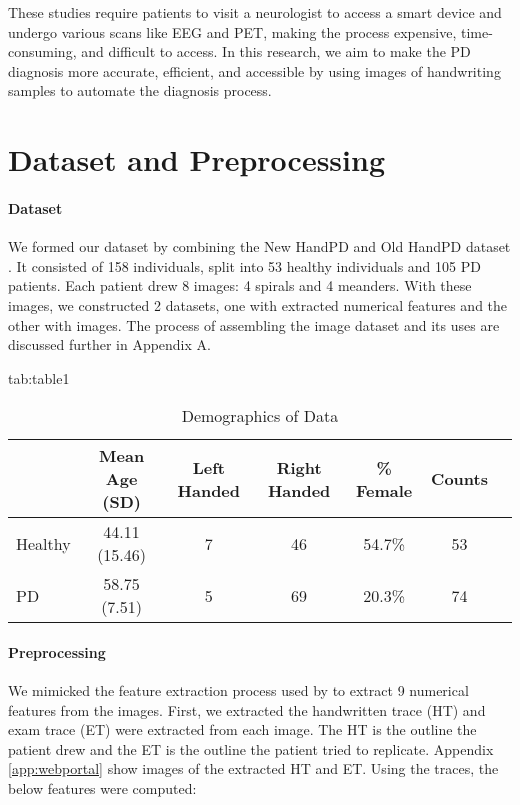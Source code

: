 \documentclass[pmlr,twocolumn,10pt,breaklinks, x11names,table]{jmlr} %
\begin{document}
These studies require patients to visit a neurologist to access a smart device and undergo various scans like EEG and PET, making the process expensive, time-consuming, and difficult to access. In this research, we aim to make the PD diagnosis more accurate, efficient, and accessible by using images of handwriting samples to automate the diagnosis process. 

\section{Dataset and Preprocessing}
\label{sec:Dataset+Preprocessing}

\paragraph{Dataset}
\label{sec:Dataset} We formed our dataset by combining the New HandPD and Old HandPD dataset \citep{pereira2016new}. It consisted of 158 individuals, split into 53 healthy individuals and 105 PD patients. Each patient drew 8 images: 4 spirals and 4 meanders. With these images, we constructed 2 datasets, one with extracted numerical features and the other with images. The process of assembling the image dataset and its uses are discussed further in Appendix A.

\begin{table*}[hbtp]
\centering 
\floatconts
{tab:table1}
{\caption{Demographics of Data}} 
    {
        \begin{tabular}{lcccccc}
        \toprule
        \bfseries & \bfseries Mean Age (SD) & \bfseries Left Handed & \bfseries Right Handed & \bfseries \% Female & \bfseries Counts \\
        \midrule
        Healthy & 44.11 (15.46) & 7 & 46 & 54.7\% & 53 \\
        PD & 58.75 (7.51) & 5 & 69 & 20.3\% & 74 \\
        \bottomrule
        \end{tabular}
    }
\end{table*}

\paragraph{Preprocessing}
\label{sec:Preprocessing} 
We mimicked the feature extraction process used by \citep{pereira2016new} to extract 9 numerical features from the images. First, we extracted the handwritten trace (HT) and exam trace (ET) were extracted from each image. The HT is the outline the patient drew and the ET is the outline the patient tried to replicate. Appendix \ref{app:webportal} show images of the extracted HT and ET. Using the traces, the below features were computed:
\end{document}
